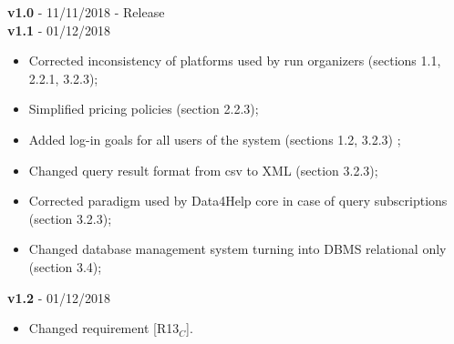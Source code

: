 \textbf{v1.0} - 11/11/2018 - Release \\
\newline
\textbf{v1.1} - 01/12/2018 \\
\begin{itemize}
    \item Corrected inconsistency of platforms used by run organizers (sections 1.1, 2.2.1, 3.2.3);
    \item Simplified pricing policies (section 2.2.3);
    \item Added log-in goals for all users of the system (sections 1.2, 3.2.3) ;
    \item Changed query result format from csv to XML (section 3.2.3);
    \item Corrected paradigm used by Data4Help core in case of query subscriptions (section 3.2.3);
    \item Changed database management system turning into DBMS relational only (section 3.4);
\end{itemize}

\textbf{v1.2} - 01/12/2018 \\
\begin{itemize}
    \item Changed requirement {[R13$_C$]}.
\end{itemize}

